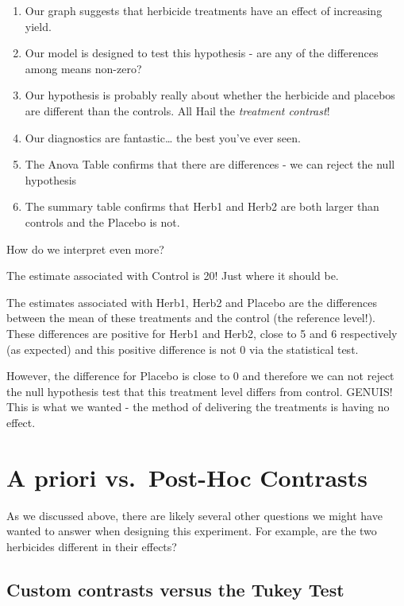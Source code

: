 \documentclass[
]{book}
\providecommand{\tightlist}{%
  \setlength{\itemsep}{0pt}\setlength{\parskip}{0pt}}
\begin{document}
\begin{enumerate}
\def\labelenumi{\arabic{enumi}.}
\tightlist
\item
  Our graph suggests that herbicide treatments have an effect of increasing yield.
\item
  Our model is designed to test this hypothesis - are any of the differences among means non-zero?
\item
  Our hypothesis is probably really about whether the herbicide and placebos are different than the controls. All Hail the \emph{treatment contrast}!
\item
  Our diagnostics are fantastic\ldots{} the best you've ever seen.
\item
  The Anova Table confirms that there are differences - we can reject the null hypothesis
\item
  The summary table confirms that Herb1 and Herb2 are both larger than controls and the Placebo is not.
\end{enumerate}

How do we interpret even more?

The estimate associated with Control is 20! Just where it should be.

The estimates associated with Herb1, Herb2 and Placebo are the differences between the mean of these treatments and the control (the reference level!). These differences are positive for Herb1 and Herb2, close to 5 and 6 respectively (as expected) and this positive difference is not 0 via the statistical test.

However, the difference for Placebo is close to 0 and therefore we can not reject the null hypothesis test that this treatment level differs from control. GENUIS! This is what we wanted - the method of delivering the treatments is having no effect.

\section{A priori vs.~Post-Hoc Contrasts}\label{a-priori-vs.-post-hoc-contrasts}

As we discussed above, there are likely several other questions we might have wanted to answer when designing this experiment. For example, are the two herbicides different in their effects?

\subsection{Custom contrasts versus the Tukey Test}\label{custom-contrasts-versus-the-tukey-test}
\end{document}
